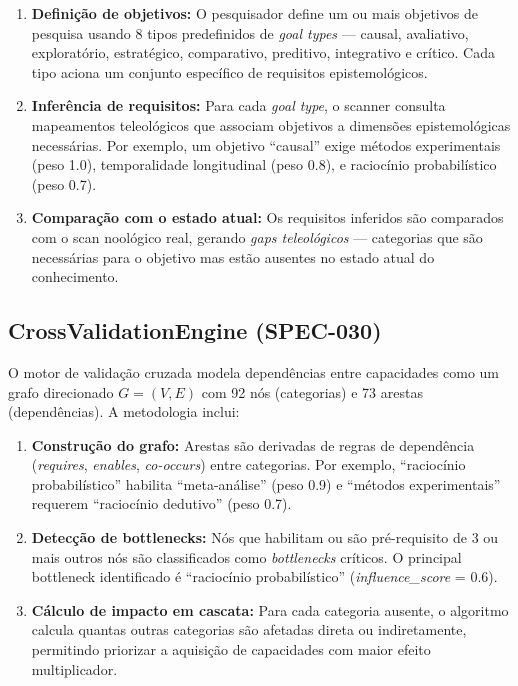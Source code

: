 \begin{enumerate}
  \item \textbf{Definição de objetivos:} O pesquisador define um ou mais objetivos de pesquisa usando 8 tipos predefinidos de \textit{goal types} --- causal, avaliativo, exploratório, estratégico, comparativo, preditivo, integrativo e crítico. Cada tipo aciona um conjunto específico de requisitos epistemológicos.
  \item \textbf{Inferência de requisitos:} Para cada \textit{goal type}, o scanner consulta mapeamentos teleológicos que associam objetivos a dimensões epistemológicas necessárias. Por exemplo, um objetivo ``causal'' exige métodos experimentais (peso 1.0), temporalidade longitudinal (peso 0.8), e raciocínio probabilístico (peso 0.7).
  \item \textbf{Comparação com o estado atual:} Os requisitos inferidos são comparados com o scan noológico real, gerando \textit{gaps teleológicos} --- categorias que são necessárias para o objetivo mas estão ausentes no estado atual do conhecimento.
\end{enumerate}

\subsection{CrossValidationEngine (SPEC-030)}

O motor de validação cruzada modela dependências entre capacidades como um grafo direcionado $G = (V, E)$ com 92 nós (categorias) e 73 arestas (dependências). A metodologia inclui:

\begin{enumerate}
  \item \textbf{Construção do grafo:} Arestas são derivadas de regras de dependência (\textit{requires}, \textit{enables}, \textit{co-occurs}) entre categorias. Por exemplo, ``raciocínio probabilístico'' habilita ``meta-análise'' (peso 0.9) e ``métodos experimentais'' requerem ``raciocínio dedutivo'' (peso 0.7).
  \item \textbf{Detecção de bottlenecks:} Nós que habilitam ou são pré-requisito de 3 ou mais outros nós são classificados como \textit{bottlenecks} críticos. O principal bottleneck identificado é ``raciocínio probabilístico'' (\textit{influence\_score} = 0.6).
  \item \textbf{Cálculo de impacto em cascata:} Para cada categoria ausente, o algoritmo calcula quantas outras categorias são afetadas direta ou indiretamente, permitindo priorizar a aquisição de capacidades com maior efeito multiplicador.
\end{enumerate}

